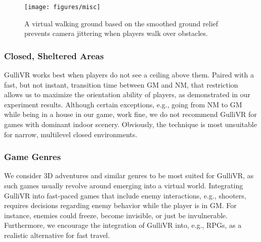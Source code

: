 \documentclass{sigchi}
\begin{document}
\begin{figure}
\centering
\texttt{[image: figures/misc]}
\caption{A virtual walking ground based on the smoothed ground relief prevents camera jittering when players walk over obstacles.}
\label{fig:misc}
\end{figure}

%

\subsubsection{Closed, Sheltered Areas}
GulliVR works best when players do not see a ceiling above them. Paired with a fast, but not instant, transition time between GM and NM, that restriction allows us to maximize the orientation ability of players, as demonstrated in our experiment results. Although certain exceptions, e.g., going from NM to GM while being in a house in our game, work fine, we do not recommend GulliVR for games with dominant indoor scenery. Obviously, the technique is most unsuitable for narrow, multilevel closed environments.

\subsubsection{Game Genres} 
We consider 3D adventures and similar genres to be most suited for GulliVR, as such games usually revolve around emerging into a virtual world. Integrating GulliVR into fast-paced games that include enemy interactions, e.g., shooters, requires decisions regarding enemy behavior while the player is in GM. For instance, enemies could freeze, become invisible, or just be invulnerable. Furthermore, we encourage the integration of GulliVR into, e.g., RPGs, as a realistic alternative for fast travel.
\end{document}
